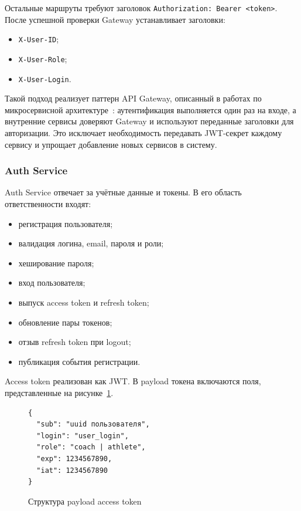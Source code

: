 Остальные маршруты требуют заголовок \passthrough{\lstinline!Authorization: Bearer <token>!}. После успешной проверки Gateway устанавливает заголовки:

\begin{itemize}
\tightlist
\item
  \passthrough{\lstinline!X-User-ID!};
\item
  \passthrough{\lstinline!X-User-Role!};
\item
  \passthrough{\lstinline!X-User-Login!}.
\end{itemize}

Такой подход реализует паттерн API Gateway, описанный в работах по микросервисной архитектуре~\cite{richardson-microservices}: аутентификация выполняется один раз на входе, а внутренние сервисы доверяют Gateway и используют переданные заголовки для авторизации. Это исключает необходимость передавать JWT-секрет каждому сервису и упрощает добавление новых сервисов в систему.

\subsubsection{Auth Service}

Auth Service отвечает за учётные данные и токены. В его область ответственности входят:

\begin{itemize}
\tightlist
\item
  регистрация пользователя;
\item
  валидация логина, email, пароля и роли;
\item
  хеширование пароля;
\item
  вход пользователя;
\item
  выпуск access token и refresh token;
\item
  обновление пары токенов;
\item
  отзыв refresh token при logout;
\item
  публикация события регистрации.
\end{itemize}

Access token реализован как JWT. В payload токена включаются поля, представленные на рисунке~\ref{src:design-jwt-payload}.

\begin{figure}
\begin{lstlisting}
{
  "sub": "uuid пользователя",
  "login": "user_login",
  "role": "coach | athlete",
  "exp": 1234567890,
  "iat": 1234567890
}
\end{lstlisting}
\caption{Структура payload access token}
\label{src:design-jwt-payload}
\end{figure}

